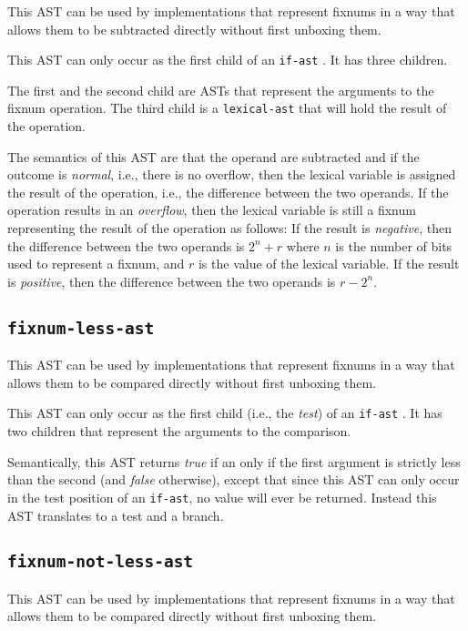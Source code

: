 This AST can be used by implementations that represent fixnums in a
way that allows them to be subtracted directly without first unboxing
them.

This AST can only occur as the first child of an \texttt{if-ast}
.  It has three children.

The first and the second child are ASTs that represent the arguments
to the fixnum operation.  The third child is a
\texttt{lexical-ast} that will hold the result of the operation.

The semantics of this AST are that the operand are subtracted and if
the outcome is \emph{normal}, i.e., there is no overflow, then the
lexical variable is assigned the result of the operation, i.e., the
difference between the two operands.  If the operation results in an
\emph{overflow}, then the lexical variable is still a fixnum
representing the result of the operation as follows: If the result is
\emph{negative}, then the difference between the two operands is $2^n
+ r$ where $n$ is the number of bits used to represent a fixnum, and
$r$ is the value of the lexical variable.  If the result is
\emph{positive}, then the difference between the two operands is $r -
2^n$.

\subsection{\texttt{fixnum-less-ast}}
\label{fixnum-less-ast}

This AST can be used by implementations that represent fixnums in a
way that allows them to be compared directly without first unboxing
them.

This AST can only occur as the first child (i.e., the \emph{test}) of
an \texttt{if-ast} .  It has two children that
represent the arguments to the comparison.  

Semantically, this AST returns \emph{true} if an only if the first
argument is strictly less than the second (and \emph{false}
otherwise), except that since this AST can only occur in the test
position of an \texttt{if-ast}, no value will ever be returned.
Instead this AST translates to a test and a branch. 

\subsection{\texttt{fixnum-not-less-ast}}
\label{fixnum-not-less-ast}

This AST can be used by implementations that represent fixnums in a
way that allows them to be compared directly without first unboxing
them.

